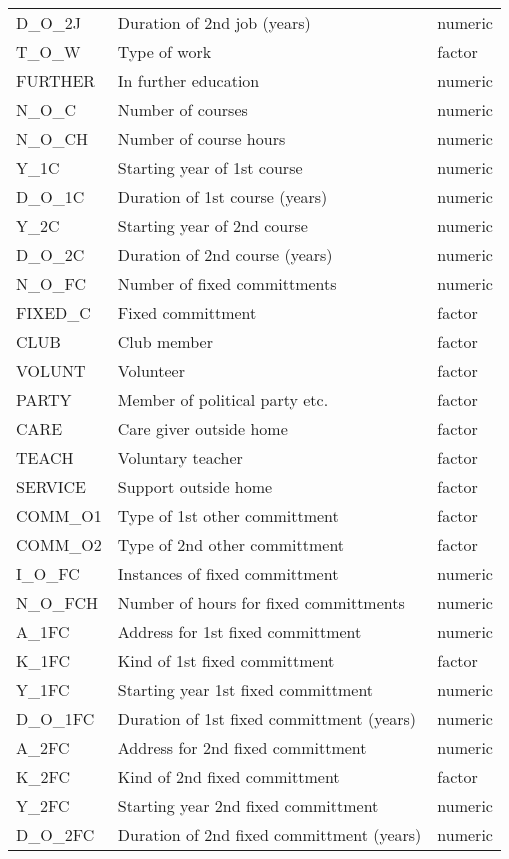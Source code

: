 \begin{longtable}{lll}
  D\_O\_2J & Duration of 2nd job (years) & numeric \\ 
  T\_O\_W & Type of work & factor \\ 
  FURTHER & In further education & numeric \\ 
  N\_O\_C & Number of courses & numeric \\ 
  N\_O\_CH & Number of course hours & numeric \\ 
  Y\_1C & Starting year of 1st course & numeric \\ 
  D\_O\_1C & Duration of 1st course  (years) & numeric \\ 
  Y\_2C & Starting year of 2nd course & numeric \\ 
  D\_O\_2C & Duration of 2nd course  (years) & numeric \\ 
  N\_O\_FC & Number of fixed committments & numeric \\ 
  FIXED\_C & Fixed committment & factor \\ 
  CLUB & Club member & factor \\ 
  VOLUNT & Volunteer & factor \\ 
  PARTY & Member of political party etc. & factor \\ 
  CARE & Care giver outside home & factor \\ 
  TEACH & Voluntary teacher & factor \\ 
  SERVICE & Support outside home & factor \\ 
  COMM\_O1 & Type of 1st other committment & factor \\ 
  COMM\_O2 & Type of 2nd other committment & factor \\ 
  I\_O\_FC & Instances of fixed committment & numeric \\ 
  N\_O\_FCH & Number of hours for fixed committments & numeric \\ 
  A\_1FC & Address for 1st fixed committment & numeric \\ 
  K\_1FC & Kind of 1st fixed committment & factor \\ 
  Y\_1FC & Starting year 1st fixed committment & numeric \\ 
  D\_O\_1FC & Duration of 1st fixed committment  (years) & numeric \\ 
  A\_2FC & Address for 2nd fixed committment & numeric \\ 
  K\_2FC & Kind of 2nd fixed committment & factor \\ 
  Y\_2FC & Starting year 2nd fixed committment & numeric \\ 
  D\_O\_2FC & Duration of 2nd fixed committment  (years) & numeric \\ 

\end{longtable}
